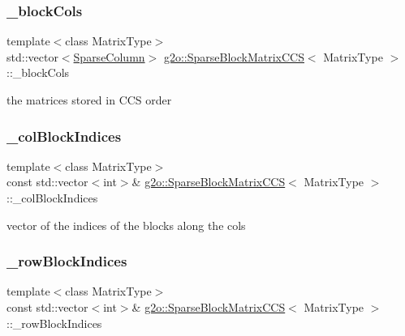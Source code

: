 \subsubsection{\texorpdfstring{\+\_\+block\+Cols}{\_blockCols}}
{\footnotesize\ttfamily template$<$class Matrix\+Type$>$ \\
std\+::vector$<$\mbox{\hyperlink{classg2o_1_1_sparse_block_matrix_c_c_s_a4fc5dfe0a9ff9bd62065ca4b17f25bc1}{Sparse\+Column}}$>$ \mbox{\hyperlink{classg2o_1_1_sparse_block_matrix_c_c_s}{g2o\+::\+Sparse\+Block\+Matrix\+C\+CS}}$<$ Matrix\+Type $>$\+::\+\_\+block\+Cols\hspace{0.3cm}{\ttfamily [protected]}}



the matrices stored in C\+CS order 

\mbox{\label{classg2o_1_1_sparse_block_matrix_c_c_s_ae31426bfb6b31bd0fd72de2e18dd5a35}} 
\subsubsection{\texorpdfstring{\+\_\+col\+Block\+Indices}{\_colBlockIndices}}
{\footnotesize\ttfamily template$<$class Matrix\+Type$>$ \\
const std\+::vector$<$int$>$\& \mbox{\hyperlink{classg2o_1_1_sparse_block_matrix_c_c_s}{g2o\+::\+Sparse\+Block\+Matrix\+C\+CS}}$<$ Matrix\+Type $>$\+::\+\_\+col\+Block\+Indices\hspace{0.3cm}{\ttfamily [protected]}}



vector of the indices of the blocks along the cols 

\mbox{\label{classg2o_1_1_sparse_block_matrix_c_c_s_afabda9a2efe5ea9efb5a1e5312f6e307}} 
\subsubsection{\texorpdfstring{\+\_\+row\+Block\+Indices}{\_rowBlockIndices}}
{\footnotesize\ttfamily template$<$class Matrix\+Type$>$ \\
const std\+::vector$<$int$>$\& \mbox{\hyperlink{classg2o_1_1_sparse_block_matrix_c_c_s}{g2o\+::\+Sparse\+Block\+Matrix\+C\+CS}}$<$ Matrix\+Type $>$\+::\+\_\+row\+Block\+Indices\hspace{0.3cm}{\ttfamily [protected]}}



